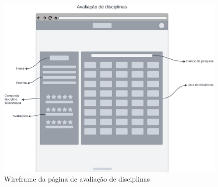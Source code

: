 \begin{figure}[ht]
    \begin{center}
    \includegraphics[width=390pt]{figuras/pagina-avaliacao.png}
    \caption{Wireframe da página de avaliação de disciplinas}
    \label{fig:wireframe-pagina-avaliacao}
    \end{center}
\end{figure}